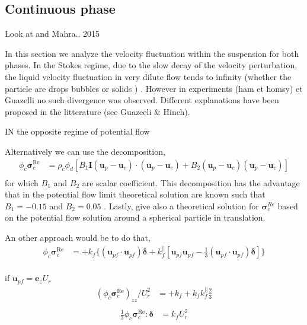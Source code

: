 \subsection{Continuous phase}
Look at \citep{wang2021numerical} and Mahra.. 2015 



In this section we analyze the velocity fluctuation within the suspension for both phases. 
In the Stokes regime, due to the slow decay of the velocity perturbation, the liquid velocity fluctuation in very dilute flow tends to infinity (whether the particle are drops bubbles or solids ) \citep{luke1965}. However in experiments (ham et homsy) et Guazelli no such divergence was observed. Different explanations have been proposed in the litterature (see Guazeeli \& Hinch).

IN the opposite regime of potential flow

Alternatively we can use the decomposition,
\begin{align}
    \phi_c\bm{\sigma}^{\text{Re}}_c &=  \rho_c \phi_d 
    \left[
        B_1\textbf{I}(\textbf{u}_p - \textbf{u}_c)\cdot (\textbf{u}_p - \textbf{u}_c) 
        +B_2 (\textbf{u}_p - \textbf{u}_c) (\textbf{u}_p - \textbf{u}_c) 
    \right]\\
\end{align}
for which $B_1$ and $B_2$ are scalar coefficient. 
This decomposition has the advantage that in the potential flow limit theoretical solution are known such that  $B_1 = -0.15$ and  $B_2 = 0.05$ \citet{zhang1994averaged,wang2021numerical}. 
Lastly, \citet{lance1991turbulence} give also a theoretical solution for $\bm{\sigma}^{Re}_c$ based on the potential flow solution around a spherical particle in translation. 


An other approach would be to do that, 
\begin{align}
    \phi_c\bm{\sigma}^{\text{Re}}_c &=  
    +k_f \{(\textbf{u}_{pf}\cdot\textbf{u}_{pf})\bm\delta
    + 
    k_f^{||}
    \left[
        \textbf{u}_{pf}\textbf{u}_{pf}
        -\frac{1}{3} (\textbf{u}_{pf}\cdot \textbf{u}_{pf})\bm\delta
    \right]\}\\
\end{align}

if $\textbf{u}_{pf} = \textbf{e}_z U_r$
\begin{align}
    (\phi_c\bm{\sigma}^{\text{Re}}_c)_{zz} / U_r^2 &=  
    + k_f  
    + 
    k_f k_f^{||} \frac{2}{3}  \\
\end{align}
\begin{align}
    \frac{1}{3}\phi_c\bm{\sigma}^{\text{Re}}_c :\bm\delta &=  
     k_f U_r^2 \\
\end{align}


